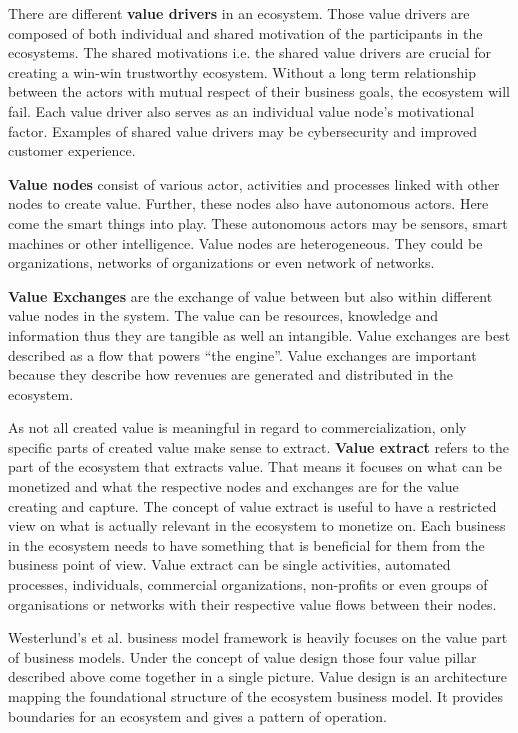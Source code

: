		There are different \textbf{value drivers} in an ecosystem. Those value drivers are composed of both individual and shared motivation of the participants in the ecosystems. The shared motivations i.e. the shared value drivers are crucial for creating a win-win trustworthy ecosystem. Without a long term relationship between the actors with mutual respect of their business goals, the ecosystem will fail. Each value driver also serves as an individual value node's motivational factor. Examples of shared value drivers may be cybersecurity and improved customer experience.

		\textbf{Value nodes} consist of various actor, activities and processes linked with other nodes to create value. Further, these nodes also have autonomous actors. Here come the smart things into play. These autonomous actors may be sensors, smart machines or other intelligence. Value nodes are heterogeneous. They could be organizations, networks of organizations or even network of networks.

		\textbf{Value Exchanges} are the exchange of value between but also within different value nodes in the system. The value can be resources, knowledge and information thus they are tangible as well an intangible. Value exchanges are best described as a flow that powers ``the engine''. Value exchanges are important because they describe how revenues are generated and distributed in the ecosystem.

		As not all created value is meaningful in regard to commercialization, only specific parts of created value make sense to extract. \textbf{Value extract} refers to the part of the ecosystem that extracts value. That means it focuses on what can be monetized and what the respective nodes and exchanges are for the value creating and capture. The concept of value extract is useful to have a restricted view on what is actually relevant in the ecosystem to monetize on. Each business in the ecosystem needs to have something that is beneficial for them from the business point of view. Value extract can be single activities, automated processes, individuals, commercial organizations, non-profits or even groups of organisations or networks with their respective value flows between their nodes.

		Westerlund's et al. business model framework is heavily focuses on the value part of business models. Under the concept of value design those four value pillar described above come together in a single picture. Value design is an architecture mapping the foundational structure of the ecosystem business model. It provides boundaries for an ecosystem and gives a pattern of operation.

